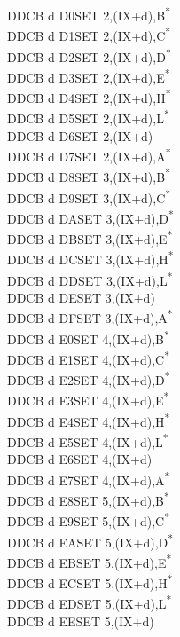 \documentclass[oneside,a4paper]{book}
\begin{document}
\begin{multicols}{3}
{\begin{tabbing}
DDCB d D0\>SET 2,(IX+d),B\textsuperscript{*}\\
DDCB d D1\>SET 2,(IX+d),C\textsuperscript{*}\\
DDCB d D2\>SET 2,(IX+d),D\textsuperscript{*}\\
DDCB d D3\>SET 2,(IX+d),E\textsuperscript{*}\\
DDCB d D4\>SET 2,(IX+d),H\textsuperscript{*}\\
DDCB d D5\>SET 2,(IX+d),L\textsuperscript{*}\\
DDCB d D6\>SET 2,(IX+d)\\
DDCB d D7\>SET 2,(IX+d),A\textsuperscript{*}\\
DDCB d D8\>SET 3,(IX+d),B\textsuperscript{*}\\
DDCB d D9\>SET 3,(IX+d),C\textsuperscript{*}\\
DDCB d DA\>SET 3,(IX+d),D\textsuperscript{*}\\
DDCB d DB\>SET 3,(IX+d),E\textsuperscript{*}\\
DDCB d DC\>SET 3,(IX+d),H\textsuperscript{*}\\
DDCB d DD\>SET 3,(IX+d),L\textsuperscript{*}\\
DDCB d DE\>SET 3,(IX+d)\\
DDCB d DF\>SET 3,(IX+d),A\textsuperscript{*}\\
DDCB d E0\>SET 4,(IX+d),B\textsuperscript{*}\\
DDCB d E1\>SET 4,(IX+d),C\textsuperscript{*}\\
DDCB d E2\>SET 4,(IX+d),D\textsuperscript{*}\\
DDCB d E3\>SET 4,(IX+d),E\textsuperscript{*}\\
DDCB d E4\>SET 4,(IX+d),H\textsuperscript{*}\\
DDCB d E5\>SET 4,(IX+d),L\textsuperscript{*}\\
DDCB d E6\>SET 4,(IX+d)\\
DDCB d E7\>SET 4,(IX+d),A\textsuperscript{*}\\
DDCB d E8\>SET 5,(IX+d),B\textsuperscript{*}\\
DDCB d E9\>SET 5,(IX+d),C\textsuperscript{*}\\
DDCB d EA\>SET 5,(IX+d),D\textsuperscript{*}\\
DDCB d EB\>SET 5,(IX+d),E\textsuperscript{*}\\
DDCB d EC\>SET 5,(IX+d),H\textsuperscript{*}\\
DDCB d ED\>SET 5,(IX+d),L\textsuperscript{*}\\
DDCB d EE\>SET 5,(IX+d)\\

\end{tabbing}}
\end{multicols}
\end{document}
